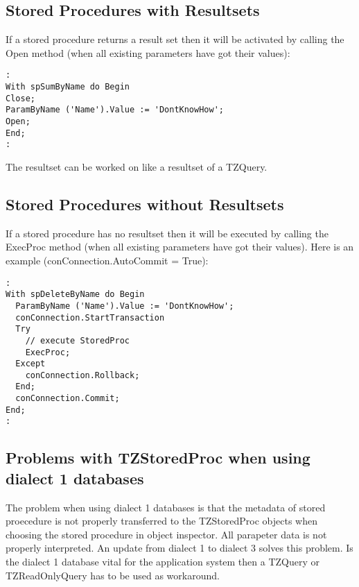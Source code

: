 \documentclass[a4paper,12pt,oneside]{book}
\begin{document}
\subsection{Stored Procedures with Resultsets}

If a stored procedure returns a result set then it will be activated by calling the Open method (when all existing parameters have got their values):

\begin{verbatim}
:
With spSumByName do Begin
Close;
ParamByName ('Name').Value := 'DontKnowHow';
Open;
End;
:
\end{verbatim}

The resultset can be worked on like a resultset of a TZQuery.

\subsection{Stored Procedures without Resultsets}

If a stored procedure has no resultset then it will be executed by calling the ExecProc method (when all existing parameters have got their values).
Here is an example (conConnection.AutoCommit = True):

\begin{verbatim}
:
With spDeleteByName do Begin
  ParamByName ('Name').Value := 'DontKnowHow';
  conConnection.StartTransaction
  Try
    // execute StoredProc
    ExecProc;
  Except
    conConnection.Rollback;
  End;
  conConnection.Commit;
End;
:
\end{verbatim}

\subsection{Problems with TZStoredProc when using dialect 1 databases}
The problem when using dialect 1 databases is that the metadata of stored proecedure is not properly
transferred to the TZStoredProc objects when choosing the stored procedure in object inspector.
All parapeter data is not properly interpreted.
An update from dialect 1 to dialect 3 solves this problem.
Is the dialect 1 database vital for the application system then a TZQuery or TZReadOnlyQuery has to be used as workaround.
\end{document}
